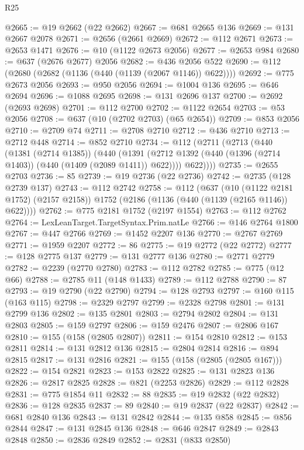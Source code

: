 \begin{lexlean}{R25}
\begin{coremodule}
@2665 := @19 @2662 (@22 @2662)
@2667 := @681 @2665 @136
@2669 := @131 @2667 @2078
@2671 := @2656 (@2661 @2669)
@2672 := @112 @2671
@2673 := @2653 @1471
@2676 := @10 (@1122 @2673 @2056)
@2677 := @2653 @984
@2680 := @637 (@2676 @2677) @2056
@2682 := @436 @2056 @522
@2690 := @112 (@2680 (@2682 (@1136 (@440 (@1139 (@2067 @1146)) @622))))
@2692 := @775 @2673 @2056
@2693 := @950 @2056
@2694 := @1004 @136
@2695 := @646 @2694
@2696 := @1088 @2695
@2698 := @131 @2696 @137
@2700 := @2692 (@2693 @2698)
@2701 := @112 @2700
@2702 := @1122 @2654
@2703 := @53 @2056
@2708 := @637 (@10 (@2702 @2703) (@65 @2654))
@2709 := @853 @2056
@2710 := @2709 @74
@2711 := @2708 @2710
@2712 := @436 @2710
@2713 := @2712 @448
@2714 := @852 @2710
@2734 := @112
    (@2711
      (@2713
        (@440
          (@1381 (@2714 @1385))
          (@440
            (@1391 (@2712 @1392 (@440 (@1396 (@2714 @1403)) (@440 (@1409 (@2089 @1411)) @622))))
            @622))))
@2735 := @2655 @2703
@2736 := 85
@2739 := @19 @2736 (@22 @2736)
@2742 := @2735 (@128 @2739 @137)
@2743 := @112 @2742
@2758 := @112
    (@637
      (@10 (@1122 @2181 @1752) (@2157 @2158))
      @1752
      (@2186 (@1136 (@440 (@1139 (@2165 @1146)) @622))))
@2762 := @775 @2181 @1752 (@2197 @1554)
@2763 := @112 @2762
@2764 := LexLeanTarget.TargetSyntax.Prim.natLe
@2766 := @146 @2764 @1800
@2767 := @447 @2766
@2769 := @1452 @2207 @136
@2770 := @2767 @2769
@2771 := @1959 @2207
@2772 := 86
@2775 := @19 @2772 (@22 @2772)
@2777 := @128 @2775 @137
@2779 := @131 @2777 @136
@2780 := @2771 @2779
@2782 := @2239 (@2770 @2780)
@2783 := @112 @2782
@2785 := @775 (@12 @66)
@2788 := @2785 @11 (@148 @1433)
@2789 := @112 @2788
@2790 := 87
@2793 := @19 @2790 (@22 @2790)
@2794 := @128 @2793
@2797 := @160 @115 (@163 @115)
@2798 := @2329 @2797
@2799 := @2328 @2798
@2801 := @131 @2799 @136
@2802 := @135 @2801
@2803 := @2794 @2802
@2804 := @131 @2803
@2805 := @159 @2797
@2806 := @159 @2476
@2807 := @2806 @167
@2810 := @155 (@158 (@2805 @2807))
@2811 := @154 @2810
@2812 := @153 @2811
@2814 := @131 @2812 @136
@2815 := @2804 @2814
@2816 := @894 @2815
@2817 := @131 @2816
@2821 := @155 (@158 (@2805 (@2805 @167)))
@2822 := @154 @2821
@2823 := @153 @2822
@2825 := @131 @2823 @136
@2826 := @2817 @2825
@2828 := @821 (@2253 @2826)
@2829 := @112 @2828
@2831 := @775 @1854 @11
@2832 := 88
@2835 := @19 @2832 (@22 @2832)
@2836 := @128 @2835
@2837 := 89
@2840 := @19 @2837 (@22 @2837)
@2842 := @681 @2840 @136
@2843 := @131 @2842
@2844 := @135 @858
@2845 := @856 @2844
@2847 := @131 @2845 @136
@2848 := @646 @2847
@2849 := @2843 @2848
@2850 := @2836 @2849
@2852 := @2831 (@833 @2850)

\end{coremodule}
\end{lexlean}
